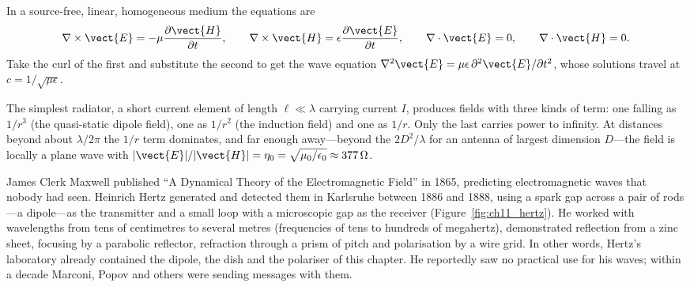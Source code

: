 \begin{deeper}
In a source-free, linear, homogeneous medium the equations are
\begin{equation}
\nabla\times\vect{E}=-\mu\frac{\partial\vect{H}}{\partial t},\qquad
\nabla\times\vect{H}=\epsilon\frac{\partial\vect{E}}{\partial t},\qquad
\nabla\cdot\vect{E}=0,\qquad\nabla\cdot\vect{H}=0 .
\end{equation}
Take the curl of the first and substitute the second to get the wave equation
$\nabla^2\vect{E}=\mu\epsilon\,\partial^2\vect{E}/\partial t^2$, whose solutions travel at
$c=1/\sqrt{\mu\epsilon}$.

The simplest radiator, a short current element of length $\ell\ll\lambda$ carrying current $I$,
produces fields with three kinds of term: one falling as $1/r^3$ (the quasi-static dipole field),
one as $1/r^2$ (the induction field) and one as $1/r$. Only the last carries power to infinity.
At distances beyond about $\lambda/2\pi$ the $1/r$ term dominates, and far enough away---beyond
the  $2D^2/\lambda$ for an antenna of largest dimension $D$---the
field is locally a plane wave with $|\vect{E}|/|\vect{H}|=\eta_0=\sqrt{\mu_0/\epsilon_0}
\approx377\,\Omega$.
\end{deeper}

\begin{history}
James Clerk Maxwell published ``A Dynamical Theory of the Electromagnetic Field'' in 1865,
predicting electromagnetic waves that nobody had seen. Heinrich Hertz generated and detected
them in Karlsruhe between 1886 and 1888, using a spark gap across a pair of rods---a
dipole---as the transmitter and a small loop with a microscopic gap as the receiver
(Figure~\ref{fig:ch11_hertz}). He worked with wavelengths from tens of centimetres to several
metres (frequencies of tens to hundreds of megahertz), demonstrated reflection from a zinc
sheet, focusing by a parabolic reflector, refraction through a prism of pitch and polarisation
by a wire grid. In other words, Hertz's laboratory already contained the dipole, the dish and
the polariser of this chapter. He reportedly saw no practical use for his waves; within a decade
Marconi, Popov and others were sending messages with them.
\end{history}



